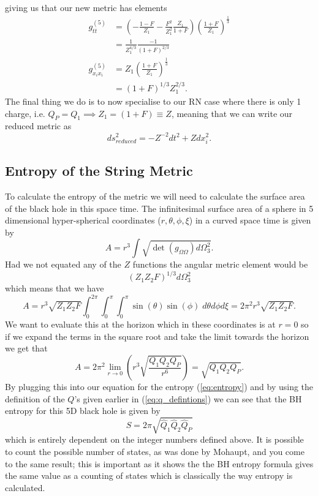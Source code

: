 \documentclass[12pt]{article}
\numberwithin{equation}{section}
\numberwithin{figure}{section}
\begin{document}
giving us that our new metric has elements
\begin{align}
	g_{tt}^{(5)}&=\left(	-\frac{1-F}{Z_{1}} -\frac{F^{2}}{Z_{1}^{2}}\frac{Z_{1}}{1+F}\right){\left(\frac{1+F}{Z_{1}}\right)}^{\frac{1}{3}}\\
	&=\frac{1}{Z_{1}^{4/3}}\frac{-1}{(1+F)^{2/3}}\\
	g_{x_{i}x_{i}}^{(5)}&=Z_{1}{\left(\frac{1+F}{Z_{1}}\right)}^{\frac{1}{3}}\\
	&=(1+F)^{1/3}Z_{1}^{2/3}.
\end{align}
The final thing we do is to now specialise to our RN case where there is only 1 charge, i.e. $Q_{P}=Q_{1} \implies Z_{1}=(1+F)\equiv Z$, meaning that we can write our reduced metric as 
\begin{equation}
	ds^{2}_{reduced}=-Z^{-2}dt^{2}+Z dx_{i}^{2}.
\end{equation}
\subsection{Entropy of the String Metric} %
\label{sub:entropy_of_the_string_metric}
To calculate the entropy of the metric we will need to calculate the surface area of the black hole in this space time. The infinitesimal surface area of a sphere in 5 dimensional hyper-spherical coordinates ($r,\theta,\phi,\xi$) in a curved space time is given by 
\begin{equation}
	A=r^{3}\int\sqrt{\det(g_{\Omega\Omega})d\Omega^{2}_{3}}.
\end{equation}
Had we not equated any of the $Z$ functions the angular metric element would be 
\begin{equation}
	\left(Z_{1}Z_{2}F\right)^{1/3}d\Omega^{2}_{3}
\end{equation}
which means that we have
\begin{equation}
	A=r^{3}\sqrt{Z_{1}Z_{2}F}\int_{0}^{2\pi}\int_{0}^{\pi}\int_{0}^{\pi} \sin(\theta)\sin(\phi)\; d\theta d\phi d\xi=2\pi^{2}r^{3}\sqrt{Z_{1}Z_{2}F}.
\end{equation}
We want to evaluate this at the horizon which in these coordinates is at $r=0$ so if we expand the terms in the square root and take the limit towards the horizon we get that
\begin{equation}
	A=2\pi^{2}\lim_{r\to 0}\left(r^{3}\sqrt{\frac{Q_{1}Q_{2}Q_{P}}{r^{6}}}\right)=\sqrt{Q_{1}Q_{2}Q_{P}}.
\end{equation}
By plugging this into our equation for the entropy (\ref{eq:entropy}) and by using the definition of the $Q$'s given earlier in (\ref{eq:q_defintions}) we can see that the BH entropy for this 5D black hole is given by
\begin{equation}
	S=2\pi\sqrt{\hat{Q}_{1}\hat{Q}_{2}\hat{Q}_{P}}
\end{equation}
which is entirely dependent on the integer numbers defined above. It is possible to count the possible number of states, as was done by Mohaupt, and you come to the same result; this is important as it shows the the BH entropy formula gives the same value as a counting of states which is classically the way entropy is calculated.
\end{document}
